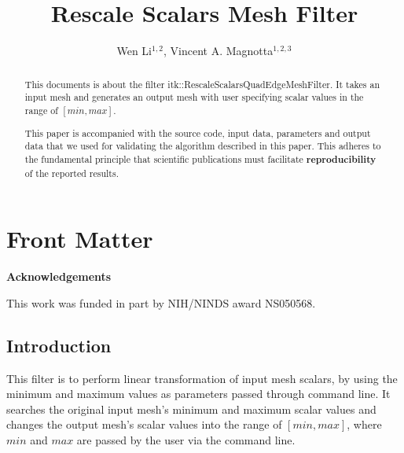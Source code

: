 \documentclass{InsightArticle}
\title{Rescale Scalars Mesh Filter}
\author{Wen Li$^{1,2}$, Vincent A. Magnotta$^{1,2,3}$}
\makeatletter
\newcommand\ackname{Acknowledgements}
\newenvironment{acknowledgements}{%
      \titlepage
      \null\vfil
      \@beginparpenalty\@lowpenalty
      \begin{center}%
        \bfseries \ackname
        \@endparpenalty\@M
      \end{center}}%
     {\par\vfil\null\endtitlepage}
\newenvironment{acknowledgements}{%
      \if@twocolumn
        \section*{\abstractname}%
      \else
        \small
        \begin{center}%
          {\bfseries \ackname\vspace{-.5em}\vspace{\z@}}%
        \end{center}%
        \quotation
      \fi}
      {\if@twocolumn\else\endquotation\fi}
\newcommand{\IJhandlerIDnumber}{3117}
\makeatother
\begin{document}
%
% 
\IJhandlefooter{\IJhandlerIDnumber}


\ifpdf
\else
\fi


\maketitle


\ifhtml
\chapter*{Front Matter\label{front}}
\fi


\begin{abstract}
 
This documents is about the filter itk::RescaleScalarsQuadEdgeMeshFilter.  It
takes an input mesh and generates an output mesh with user specifying scalar
values in the range of $[min, max]$.

This paper is accompanied with the source code, input data, parameters and
output data that we used for validating the algorithm described in this paper.
This adheres to the fundamental principle that scientific publications must
facilitate \textbf{reproducibility} of the reported results.
\end{abstract}

\begin{acknowledgements}
This work was funded in part by NIH/NINDS award NS050568.
\end{acknowledgements}

\tableofcontents

\section{Introduction}
This filter is to perform linear transformation of input mesh scalars, by using the 
minimum and maximum values as parameters passed through command line. 
It searches the original input mesh's minimum and maximum scalar values and 
changes the output mesh's scalar values into the range of $[min, max]$, 
where $min$ and $max$ are passed by the user via the command line.
\end{document}
